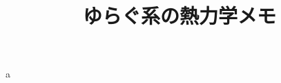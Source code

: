 \documentclass[a4paper, 11pt]{jsarticle}
\title{ゆらぐ系の熱力学メモ}
\author{}
\date{}
\numberwithin{equation}{section}
\begin{document}
a
\end{document}
